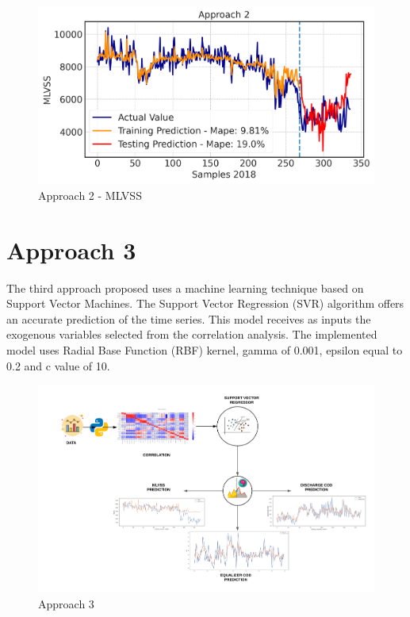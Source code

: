\begin{figure}[h]
\centering
\includegraphics[width=\linewidth]{figures/Ch6/MVLSS-approach2.png}
\caption{Approach 2 - MLVSS}
\label{f:App2-MLVSS}
\end{figure}

\section{Approach 3}
\label{s:Approach3}

The third approach proposed uses a machine learning technique based on Support Vector Machines. The Support Vector Regression (SVR) algorithm offers an accurate prediction of the time series. This model receives as inputs the exogenous variables selected from the correlation analysis. The implemented model uses Radial Base Function (RBF) kernel, gamma of 0.001, epsilon equal to 0.2 and c value of 10.

\begin{figure}[h]
\centering
\includegraphics[width=\linewidth]{figures/Ch4/Approach3.png}
\caption{Approach 3}
\label{f:Approach 3}
\end{figure}


